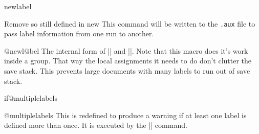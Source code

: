  \begin{docCommand}{newlabel}{}
  
   {Remove  so still defined in new }
    This command will be written to the \texttt{.aux} file to
    pass label information from one run to another.
    
  \begin{docCommand}{@newl@bel}{}
    The internal form of |\newlabel| and |\bibcite|. Note that this
    macro does it's work inside a group. That way the local
    assignments it needs to do don't clutter the save stack. This
    prevents large documents with many labels to run out of save
    stack.

    \begin{teX}
\def\@newl@bel#1#2#3{{%
  \@ifundefined{#1@#2}%
    \relax
    {\gdef \@multiplelabels {%
       \@latex@warning@no@line{There were multiply-defined labels}}%
     \@latex@warning@no@line{Label `#2' multiply defined}}%
  \global\@namedef{#1@#2}{#3}}}
    \end{teX}
  
    \begin{teX}
\def\newlabel{\@newl@bel r}
    \end{teX}
  
    \begin{teX}
\@onlypreamble\@newl@bel
    \end{teX}
  \end{docCommand}
  \end{docCommand}


  \begin{docCommand}{if@multiplelabels}{}
  \begin{docCommand}{@multiplelabels}{}
    This is redefined to produce a warning if at least one label is
    defined more than once. It is executed by the |\enddocument|
    command.
    \begin{teX}
\let \@multiplelabels \relax
    \end{teX}
  \end{docCommand}
  \end{docCommand}


